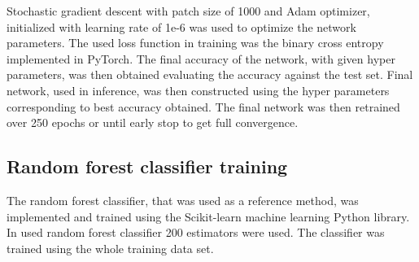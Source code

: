 \documentclass[aps,prb,10pt,twocolumn,groupedaddress]{revtex4-1}
\begin{document}
Stochastic gradient descent with patch size of 1000 and Adam optimizer\cite{adam}, initialized with learning rate of 1e-6 was used to optimize the network parameters. The used loss function in training was the binary cross entropy implemented in PyTorch\cite{pytorch}. The final accuracy of the network, with given hyper parameters, was then obtained evaluating the accuracy against the test set. Final network, used in inference, was then constructed using the hyper parameters corresponding to best accuracy obtained. The final network was then retrained over 250 epochs or until early stop to get full convergence.

\subsection{Random forest classifier training}
\label{sec:computational_methods_training_random_forest}
The random forest classifier, that was used as a reference method, was implemented and trained using the Scikit-learn machine learning Python library. In used random forest classifier 200 estimators were used. The classifier was trained using the whole training data set.
\end{document}

